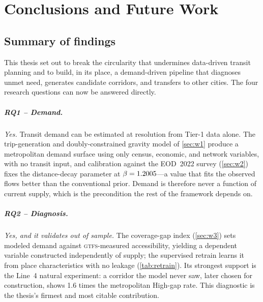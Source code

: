 \chapter{Conclusions and Future Work}
\label{ch:conclusions}

\section{Summary of findings}
\label{sec:concl-summary}

This thesis set out to break the circularity that undermines data-driven transit
planning and to build, in its place, a demand-driven pipeline that diagnoses unmet need,
generates candidate corridors, and transfers to other cities. The four research
questions can now be answered directly.

\paragraph{RQ1 -- Demand.} \emph{Yes.} Transit demand can be estimated at \ageb
resolution from Tier-1 data alone. The trip-generation and doubly-constrained gravity
model of \cref{sec:w1} produce a metropolitan demand surface using only census, economic,
and network variables, with no transit input, and calibration against the EOD~2022 survey
(\cref{sec:w2}) fixes the distance-decay parameter at $\beta=1.2005$---a value that
fits the observed flows better than the conventional prior. Demand is therefore never a
function of current supply, which is the precondition the rest of the framework depends on.

\paragraph{RQ2 -- Diagnosis.} \emph{Yes, and it validates out of sample.} The
coverage-gap index (\cref{sec:w3}) sets modeled demand against \textsc{gtfs}-measured
accessibility, yielding a dependent variable constructed independently of supply; the
supervised retrain learns it from place characteristics with no leakage
(\cref{tab:retrain}). Its strongest support is the Line~4 natural experiment: a corridor
the model never saw, later chosen for construction, shows \num{1.6} times the
metropolitan High-gap rate. This diagnostic is the thesis's firmest and most citable
contribution.

